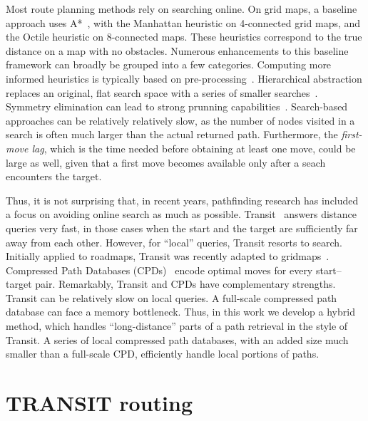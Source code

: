 \documentclass[runningheads,a4paper]{llncs}
\begin{document}
Most route planning methods rely on searching online.
On grid maps, a baseline approach uses A*~\cite{hart68}, with 
the Manhattan heuristic on 4-connected grid maps,
and the Octile heuristic on 8-connected maps.
These heuristics correspond to the true distance on a map with no obstacles.
Numerous enhancements to this baseline framework can broadly be grouped into
a few categories. Computing more informed heuristics is typically based on
pre-processing~\cite{goldberg05,bjornsson06,sturtevant09}.
Hierarchical abstraction replaces an original, flat search space with a
series of smaller searches~\cite{botea04,sturtevant05}.
Symmetry elimination can lead to strong prunning 
capabilities~\cite{harabor10,harabor11b}.
Search-based approaches can be relatively relatively slow, as the number of 
nodes visited in a search is often much larger than the actual returned path.
Furthermore, the \emph{first-move lag}, which is the time needed before
obtaining at least one move, could be large as well, given that a first move
becomes available only after a seach encounters the target.

Thus, it is not surprising that, in recent years,
pathfinding research has included a focus on avoiding online search
as much as possible.
Transit~\cite{bast06} answers distance queries very fast, in those
cases when the start and the target are sufficiently far away from each
other. However, for ``local'' queries, Transit resorts to search.
Initially applied to roadmaps, Transit was recently adapted to 
gridmaps~\cite{antsfeld12}.
Compressed Path Databases (CPDs)~\cite{botea11,DBLP:conf/socs/Botea12}
encode optimal moves for every start--target pair.
Remarkably, Transit and CPDs have complementary strengths.
Transit can be relatively slow on local queries. 
A full-scale compressed path database can face a memory bottleneck.
Thus, in this work we develop a hybrid method, which handles 
``long-distance'' parts of a path retrieval in the style of Transit.
A series of local compressed path databases, with an added size much
smaller than a full-scale CPD, efficiently handle local portions
of paths.




\section{TRANSIT routing}\label{sec:transit}
\end{document}
